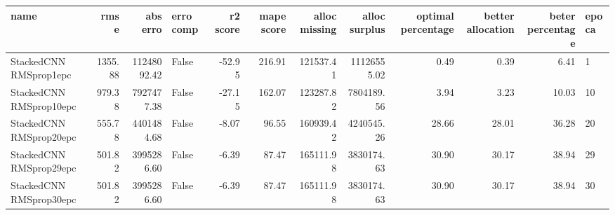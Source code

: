 \begin{tabular}{lrrlrrrrrrrl}
\toprule
name & rmse & abs erro & erro comp & r2 score & mape score & alloc missing & alloc surplus & optimal percentage & better allocation & beter percentage & epoca \\
\midrule
StackedCNN RMSprop1epc & 1355.88 & 11248092.42 & False & -52.95 & 216.91 & 121537.41 & 11126555.02 & 0.49 & 0.39 & 6.41 & 1 \\
StackedCNN RMSprop10epc & 979.38 & 7927477.38 & False & -27.15 & 162.07 & 123287.82 & 7804189.56 & 3.94 & 3.23 & 10.03 & 10 \\
StackedCNN RMSprop20epc & 555.78 & 4401484.68 & False & -8.07 & 96.55 & 160939.42 & 4240545.26 & 28.66 & 28.01 & 36.28 & 20 \\
StackedCNN RMSprop29epc & 501.82 & 3995286.60 & False & -6.39 & 87.47 & 165111.98 & 3830174.63 & 30.90 & 30.17 & 38.94 & 29 \\
StackedCNN RMSprop30epc & 501.82 & 3995286.60 & False & -6.39 & 87.47 & 165111.98 & 3830174.63 & 30.90 & 30.17 & 38.94 & 30 \\
\bottomrule
\end{tabular}
